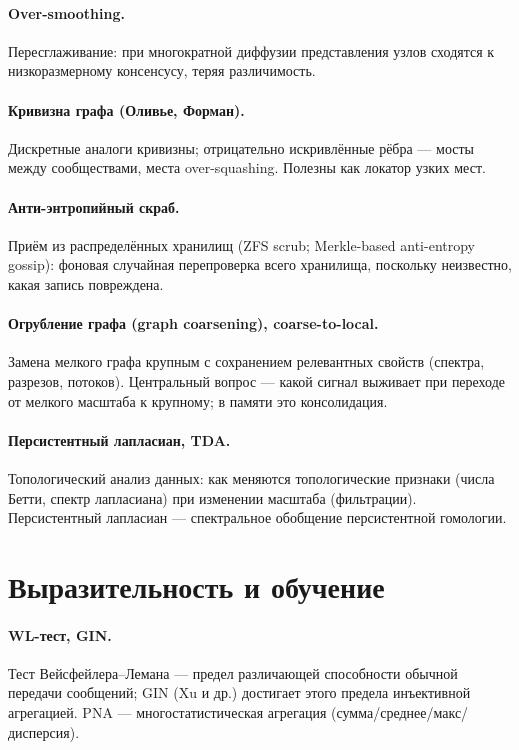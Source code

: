 \paragraph{Over-smoothing.} Пересглаживание: при многократной диффузии
представления узлов сходятся к низкоразмерному консенсусу, теряя различимость.

\paragraph{Кривизна графа (Оливье, Форман).} Дискретные аналоги кривизны;
отрицательно искривлённые рёбра — мосты между сообществами, места over-squashing.
Полезны как локатор узких мест.

\paragraph{Анти-энтропийный скраб.} Приём из распределённых хранилищ (ZFS scrub;
Merkle-based anti-entropy gossip): фоновая случайная перепроверка всего хранилища,
поскольку неизвестно, какая запись повреждена.

\paragraph{Огрубление графа (graph coarsening), coarse-to-local.} Замена мелкого
графа крупным с сохранением релевантных свойств (спектра, разрезов, потоков).
Центральный вопрос — какой сигнал выживает при переходе от мелкого масштаба к
крупному; в памяти это консолидация.

\paragraph{Персистентный лапласиан, TDA.} Топологический анализ данных: как меняются
топологические признаки (числа Бетти, спектр лапласиана) при изменении масштаба
(фильтрации). Персистентный лапласиан — спектральное обобщение персистентной
гомологии.

\section*{Выразительность и обучение}

\paragraph{WL-тест, GIN.} Тест Вейсфейлера–Лемана — предел различающей способности
обычной передачи сообщений; GIN (Xu и др.) достигает этого предела инъективной
агрегацией. PNA — многостатистическая агрегация (сумма/среднее/макс/дисперсия).

